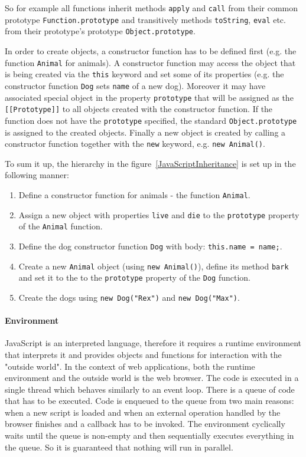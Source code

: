 \documentclass[12pt,a4paper]{report}
\begin{document}
So for example all functions inherit methods \texttt{apply} and \texttt{call} from their common prototype \texttt{Function.prototype} and transitively methods \texttt{toString}, \texttt{eval} etc. from their prototype's prototype \texttt{Object.prototype}.

In order to create objects, a constructor function has to be defined first (e.g. the function \texttt{Animal} for animals). A constructor function may access the object that is being created via the \texttt{this} keyword and set some of its properties (e.g. the constructor function \texttt{Dog} sets \texttt{name} of a new dog). Moreover it may have associated special object in the property \texttt{prototype} that will be assigned as the \texttt{[[Prototype]]} to all objects created with the constructor function. If the function does not have the \texttt{prototype} specified, the standard \texttt{Object.prototype} is assigned to the created objects. Finally a new object is created by calling a constructor function together with the \texttt{new} keyword, e.g. \texttt{new Animal()}.

To sum it up, the hierarchy in the figure~\ref{JavaScriptInheritance} is set up in the following manner:

\begin{enumerate}
\item Define a constructor function for animals - the function \texttt{Animal}.
\item Assign a new object with properties \texttt{live} and \texttt{die} to the \texttt{prototype} property of the \texttt{Animal} function.
\item Define the dog constructor function \texttt{Dog} with body: \texttt{this.name = name;}.
\item Create a new \texttt{Animal} object (using \texttt{new Animal()}), define its method \texttt{bark} and set it to the to the \texttt{prototype} property of the \texttt{Dog} function.
\item Create the dogs using \texttt{new Dog("Rex")} and \texttt{new Dog("Max")}.
\end{enumerate}

\paragraph{Environment} JavaScript is an interpreted language, therefore it requires a runtime environment that interprets it and provides objects and functions for interaction with the "outside world". In the context of web applications, both the runtime environment and the outside world is the web browser. The code is executed in a single thread which behaves similarly to an event loop. There is a queue of code that has to be executed. Code is enqueued to the queue from two main reasons: when a new script is loaded and when an external operation handled by the browser finishes and a callback has to be invoked. The environment cyclically waits until the queue is non-empty and then sequentially executes everything in the queue. So it is guaranteed that nothing will run in parallel.
\end{document}
